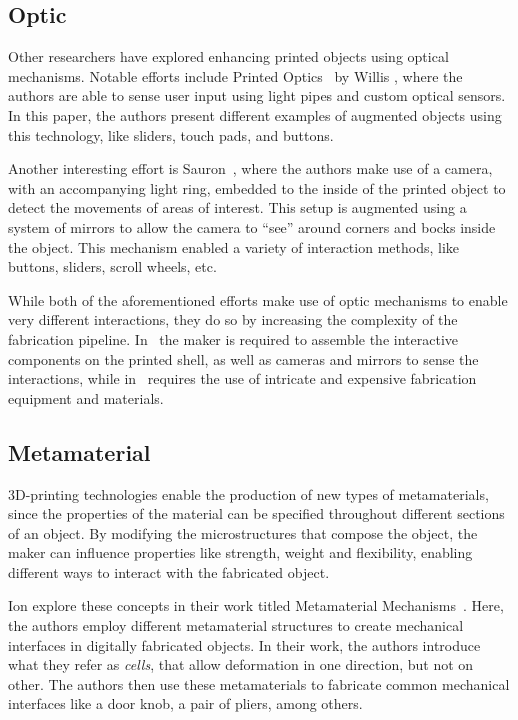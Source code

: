     \subsection{Optic}
      Other researchers have explored enhancing printed objects using optical
      mechanisms. Notable efforts include Printed Optics~\cite{Willis:2012bc}
      by Willis \etal, where the authors are able to sense user input using
      light pipes and custom optical sensors. In this paper, the authors
      present different examples of augmented objects using this technology,
      like sliders, touch pads, and buttons.

      Another interesting effort is Sauron~\cite{Savage:2013kua}, where the
      authors make use of a camera, with an accompanying light ring, embedded
      to the inside of the printed object to detect the movements of
      areas of interest. This setup is augmented using a
      system of mirrors to allow the camera to  ``see'' around corners and
      bocks inside the object. This mechanism enabled a variety of interaction
      methods, like buttons, sliders, scroll wheels, etc.
      
      While both of the aforementioned efforts make use of optic mechanisms to
      enable very different interactions, they do so by increasing the
      complexity of the fabrication pipeline. In~\cite{Savage:2013kua} the
      maker is required to assemble the interactive components on the printed
      shell, as well as cameras and mirrors to sense the interactions, while
      in~\cite{Willis:2012bc} requires the use of intricate and expensive
      fabrication equipment and materials.

    \subsection{Metamaterial}
      3D-printing technologies enable the production of new types of
      metamaterials, since the properties of the material can be specified
      throughout different sections of an object. By modifying the
      microstructures that compose the object, the maker can influence
      properties like strength, weight and flexibility, enabling different ways
      to interact with the fabricated object.
      
      Ion \etal explore these concepts in their work titled Metamaterial
      Mechanisms~\cite{Ion:2016kx}. Here, the authors employ different
      metamaterial structures to create mechanical interfaces in digitally
      fabricated objects. In their work, the authors introduce what they refer
      as \emph{cells}, that allow deformation in one direction, but not on
      other. The authors then use these metamaterials to fabricate common
      mechanical interfaces like a door knob, a pair of pliers, among others.
      
